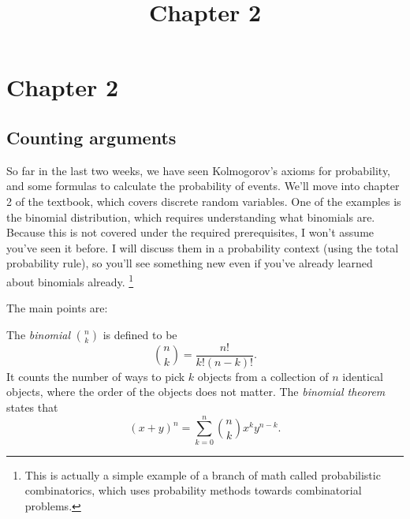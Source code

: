 \documentclass{ximera}
\title{Chapter 2}
\begin{document}
\begin{abstract}
\end{abstract}
\maketitle
\section{Chapter 2}

\subsection{Counting arguments}
So far in the last two weeks, we have seen Kolmogorov's axioms for probability, and some formulas to calculate the probability of events. We'll move into chapter 2 of the textbook, which covers discrete random variables. One of the examples is the binomial distribution, which requires understanding what binomials are. Because this is not covered under the required prerequisites, I won't assume you've seen it before. I will discuss them in a probability context (using the total probability rule), so you'll see something new even if you've already learned about binomials already. \footnote{This is actually a simple example of a branch of math called probabilistic combinatorics, which uses probability methods towards combinatorial problems.}

The main points are:

\begin{definition}
The \textit{binomial} $\binom{n}{k}$ is defined to be
$$
\binom{n}{k} = \frac{n!}{k! (n-k)!}.
$$
It counts the number of ways to pick $k$ objects from a collection of $n$ identical objects, where the order of the objects does not matter.  The \textit{binomial theorem} states that
$$
(x+y)^n = \sum_{k=0}^n \binom{n}{k} x^k y^{n-k}.
$$
\end{definition}
\end{document}
